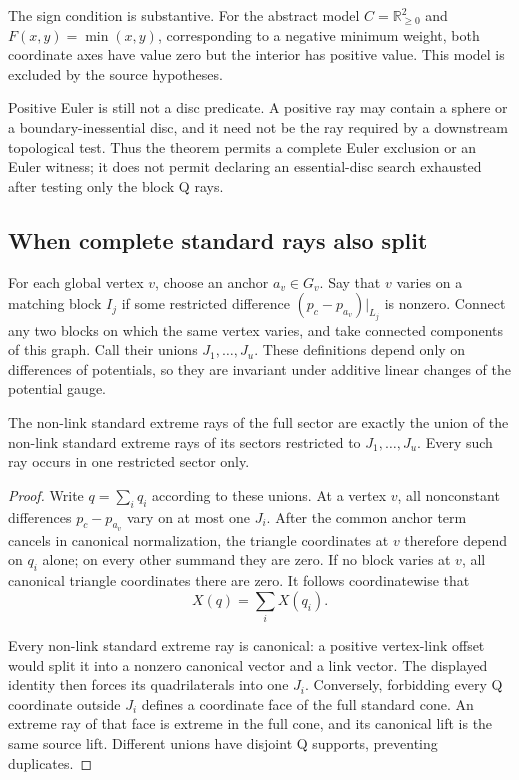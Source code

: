 The sign condition is substantive.  For the abstract model
$C=\mathbb R_{\geq0}^2$ and $F(x,y)=\min(x,y)$, corresponding to a negative
minimum weight, both coordinate axes have value zero but the interior has
positive value.  This model is excluded by the source hypotheses.

Positive Euler is still not a disc predicate.  A positive ray may contain
a sphere or a boundary-inessential disc, and it need not be the ray required
by a downstream topological test.  Thus the theorem permits a complete
Euler exclusion or an Euler witness; it does not permit declaring an
essential-disc search exhausted after testing only the block Q rays.

\subsection{When complete standard rays also split}

For each global vertex $v$, choose an anchor $a_v\in G_v$.  Say that $v$
varies on a matching block $I_j$ if some restricted difference
$(p_c-p_{a_v})|_{L_j}$ is nonzero.  Connect any two blocks on which the same
vertex varies, and take connected components of this graph.  Call their
unions $J_1,\ldots,J_u$.  These definitions depend only on differences of
potentials, so they are invariant under additive linear changes of the
potential gauge.

\begin{theorem}
\label{sec:sector-standard-clusters}
The non-link standard extreme rays of the full sector are exactly the union
of the non-link standard extreme rays of its sectors restricted to
$J_1,\ldots,J_u$.  Every such ray occurs in one restricted sector only.
\end{theorem}
\begin{proof}
Write $q=\sum_iq_i$ according to these unions.  At a vertex $v$, all
nonconstant differences $p_c-p_{a_v}$ vary on at most one $J_i$.
After the common anchor term cancels in canonical normalization, the
triangle coordinates at $v$ therefore depend on $q_i$ alone; on every other
summand they are zero.  If no block varies at $v$, all canonical triangle
coordinates there are zero.  It follows coordinatewise that
\[
                         X(q)=\sum_i X(q_i).
\]

Every non-link standard extreme ray is canonical: a positive vertex-link
offset would split it into a nonzero canonical vector and a link vector.
The displayed identity then forces its quadrilaterals into one $J_i$.
Conversely, forbidding every Q coordinate outside $J_i$ defines a coordinate
face of the full standard cone.  An extreme ray of that face is extreme
in the full cone, and its canonical lift is the same source lift.
Different unions have disjoint Q supports, preventing duplicates.
\end{proof}

